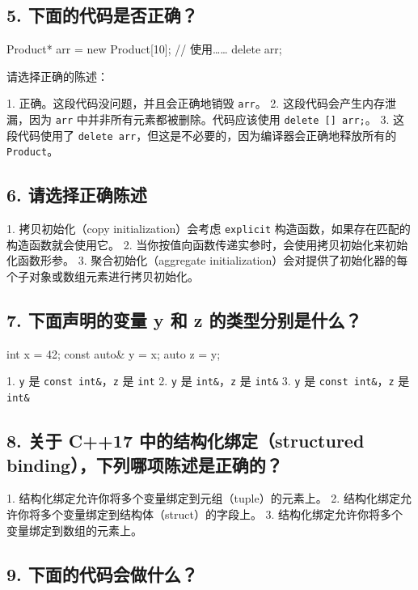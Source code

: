 \subsection{5. 下面的代码是否正确？}

\begin{codebox}[cpp]
Product* arr = new Product[10];
// 使用……
delete arr;
\end{codebox}

请选择正确的陈述：

1. 正确。这段代码没问题，并且会正确地销毁 \texttt{arr}。
2. 这段代码会产生内存泄漏，因为 \texttt{arr} 中并非所有元素都被删除。代码应该使用 \texttt{delete [] arr;}。
3. 这段代码使用了 \texttt{delete arr}，但这是不必要的，因为编译器会正确地释放所有的 \texttt{Product}。

\subsection{6. 请选择正确陈述}

1. 拷贝初始化（copy initialization）会考虑 \texttt{explicit} 构造函数，如果存在匹配的构造函数就会使用它。
2. 当你按值向函数传递实参时，会使用拷贝初始化来初始化函数形参。
3. 聚合初始化（aggregate initialization）会对提供了初始化器的每个子对象或数组元素进行拷贝初始化。

\subsection{7. 下面声明的变量 y 和 z 的类型分别是什么？}

\begin{codebox}[cpp]
int x = 42;
const auto& y = x;
auto z = y;
\end{codebox}

1. \texttt{y} 是 \texttt{const int\&}，\texttt{z} 是 \texttt{int}
2. \texttt{y} 是 \texttt{int\&}，\texttt{z} 是 \texttt{int\&}
3. \texttt{y} 是 \texttt{const int\&}，\texttt{z} 是 \texttt{int\&}

\subsection{8. 关于 C++17 中的结构化绑定（structured binding），下列哪项陈述是正确的？}

1. 结构化绑定允许你将多个变量绑定到元组（tuple）的元素上。
2. 结构化绑定允许你将多个变量绑定到结构体（struct）的字段上。
3. 结构化绑定允许你将多个变量绑定到数组的元素上。

\subsection{9. 下面的代码会做什么？}

